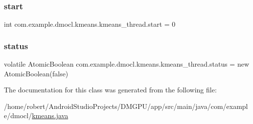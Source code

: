 \subsubsection{\texorpdfstring{start}{start}}
{\footnotesize\ttfamily int com.\+example.\+dmocl.\+kmeans.\+kmeans\+\_\+thread.\+start = 0\hspace{0.3cm}{\ttfamily [private]}}

\mbox{\label{classcom_1_1example_1_1dmocl_1_1kmeans_1_1kmeans__thread_a43516296d56b428832782a5b52475bec}} 
\subsubsection{\texorpdfstring{status}{status}}
{\footnotesize\ttfamily volatile Atomic\+Boolean com.\+example.\+dmocl.\+kmeans.\+kmeans\+\_\+thread.\+status = new Atomic\+Boolean(false)\hspace{0.3cm}{\ttfamily [private]}}



The documentation for this class was generated from the following file\+:\begin{DoxyCompactItemize}
\item 
/home/robert/\+Android\+Studio\+Projects/\+D\+M\+G\+P\+U/app/src/main/java/com/example/dmocl/\mbox{\hyperlink{kmeans_8java}{kmeans.\+java}}\end{DoxyCompactItemize}
